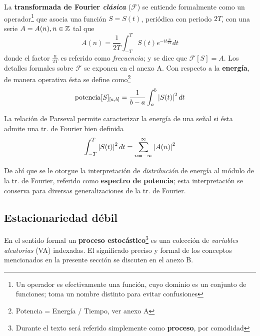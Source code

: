 La \textbf{transformada de Fourier \textit{clásica}} ($\mathscr{F} $) se entiende formalmente como 
un operador\footnote{Un operador es efectivamente una función, cuyo dominio es un conjunto de 
funciones; toma un nombre distinto para evitar confusiones} que asocia una función $S=S(t)$,
periódica con periodo $2T$, con una serie $A = A(n),  {n\in \mathbb{Z}}$ tal que
\begin{equation*}
A(n) = \frac{1}{2T} \int_{-T}^{T} S(t) e^{ -i t \frac{n}{2T}} dt
\end{equation*}
%
donde el factor $\frac{n}{2T}$ es referido como \textit{frecuencia}; y se dice que 
$\mathscr{F}[S] = A$. Los detalles formales sobre $\mathscr{F}$ se exponen en el anexo A.
%
Con respecto a la \textbf{energía}, de manera operativa ésta se define 
como\footnote{Potencia = Energía / Tiempo, ver anexo A}
\begin{align*}
\text{potencia}[S]_{[a,b]} = \frac{1}{b-a} \int_a^{b} \left| S(t) \right|^{2} dt
\end{align*}

La relación de Parseval permite caracterizar la energía de una señal si ésta admite una tr. de
Fourier bien definida
%
\begin{equation*}
\int_{-T}^{T} \left| S(t) \right|^{2} dt = \sum_{n=-\infty}^{\infty} \left| A(n) \right|^{2}
\end{equation*}

De ahí que se le otorgue la interpretación de \textit{distribución} de energía al módulo de la 
tr. de Fourier, referido como \textbf{espectro de potencia}; esta interpretación se conserva
para diversas generalizaciones de la tr. de Fourier.
%
%



\subsection{Estacionariedad débil}

En el sentido formal un \textbf{proceso estocástico}\footnote{Durante el texto será referido 
simplemente como \textbf{proceso}, por comodidad} \xt es una colección de \textit{variables 
aleatorias} (VA) indexadas.
El significado preciso y formal de los conceptos mencionados en la presente sección se discuten en
el anexo B.


